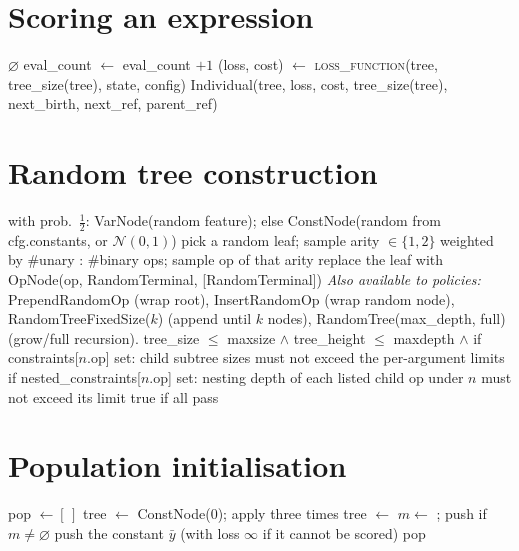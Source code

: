 \documentclass[11pt]{article}
\newcommand{\slot}[1]{\textcolor{blue!70!black}{\textsc{#1}}}
\newcommand{\cmt}[1]{\Comment{\textit{#1}}}
\begin{document}
\section*{Scoring an expression}
\begin{algorithmic}[1]
   \Return $\varnothing$ \EndIf
  \State eval\_count $\gets$ eval\_count $+ 1$
  \State (loss, cost) $\gets$ \slot{loss\_function}(tree, tree\_size(tree), state, config) \cmt{$\varnothing$ if rejected}
  \State \Return Individual(tree, loss, cost, tree\_size(tree), next\_birth, next\_ref, parent\_ref)
\EndFunction
\end{algorithmic}

\section*{Random tree construction}
\begin{algorithmic}[1]
  \State with prob.\ $\tfrac12$: VarNode(random feature); else ConstNode(random from cfg.constants, or $\mathcal N(0,1)$)
\EndFunction
{}
  \State pick a random leaf; sample arity $\in\{1,2\}$ weighted by \#unary : \#binary ops; sample op of that arity
  \State replace the leaf with OpNode(op, RandomTerminal, [RandomTerminal])
\EndFunction
\State \textit{Also available to policies:} PrependRandomOp (wrap root), InsertRandomOp (wrap random node),
\Statex RandomTreeFixedSize($k$) (append until $k$ nodes), RandomTree(max\_depth, full) (grow/full recursion).
  \State \Return tree\_size $\le$ maxsize $\land$ tree\_height $\le$ maxdepth $\land$ 
\EndFunction
{}
    \State if constraints[$n$.op] set: child subtree sizes must not exceed the per-argument limits
    \State if nested\_constraints[$n$.op] set: nesting depth of each listed child op under $n$ must not exceed its limit
  \EndFor
  \State \Return true if all pass
\EndFunction
\end{algorithmic}

\section*{Population initialisation}
\begin{algorithmic}[1]
  \State pop $\gets [\,]$
    \State tree $\gets$ ConstNode(0); apply  three times
     tree $\gets$  \EndIf
    \State $m \gets$ ; push if $m \ne \varnothing$
  \EndWhile
   push the constant $\bar y$ (with loss $\infty$ if it cannot be scored) \EndIf
  \State \Return pop
\EndFunction
\end{algorithmic}
\end{document}
